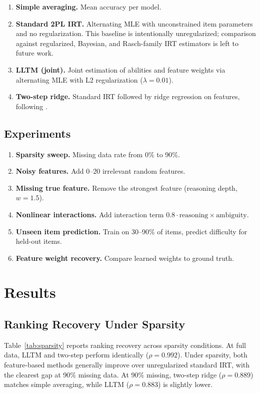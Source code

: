 \documentclass[11pt,a4paper]{article}
\begin{document}
\begin{enumerate}[nosep]
\item \textbf{Simple averaging.} Mean accuracy per model.
\item \textbf{Standard 2PL IRT.} Alternating MLE with unconstrained
item parameters and no regularization. This baseline is intentionally
unregularized; comparison against regularized, Bayesian, and
Rasch-family IRT estimators is left to future work.
\item \textbf{LLTM (joint).} Joint estimation of abilities and feature
weights via alternating MLE with L2 regularization ($\lambda = 0.01$).
\item \textbf{Two-step ridge.} Standard IRT followed by ridge regression
on features, following \citet{ge2026agent}.
\end{enumerate}

\subsection{Experiments}

\begin{enumerate}[nosep]
\item \textbf{Sparsity sweep.} Missing data rate from 0\% to 90\%.
\item \textbf{Noisy features.} Add 0--20 irrelevant random features.
\item \textbf{Missing true feature.} Remove the strongest feature
(reasoning depth, $w = 1.5$).
\item \textbf{Nonlinear interactions.} Add interaction term
$0.8 \cdot \text{reasoning} \times \text{ambiguity}$.
\item \textbf{Unseen item prediction.} Train on 30--90\% of items,
predict difficulty for held-out items.
\item \textbf{Feature weight recovery.} Compare learned weights to
ground truth.
\end{enumerate}


\section{Results}
\label{sec:results}

\subsection{Ranking Recovery Under Sparsity}

Table~\ref{tab:sparsity} reports ranking recovery across sparsity
conditions. At full data, LLTM and two-step perform identically
($\rho = 0.992$). Under sparsity, both feature-based methods
generally improve over unregularized standard IRT, with the clearest
gap at 90\% missing data. At 90\% missing, two-step ridge ($\rho = 0.889$)
matches simple averaging, while LLTM ($\rho = 0.883$) is slightly
lower.
\end{document}
